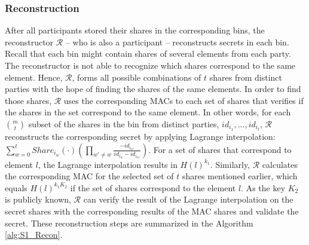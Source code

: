 \subsubsection{Reconstruction}\label{Recon_S1}
After all participants stored their shares in the corresponding bins, the reconstructor  $\mathcal{R}$ -- who is also a participant -- reconstructs secrets in each bin. Recall that each bin might contain shares of several elements from each party. The reconstructor is not able to recognize which shares correspond to the same element. Hence, $\mathcal{R}$, forms all possible combinations of $t$ shares from distinct parties with the hope of finding the shares of the same elements. In order to find those shares, $\mathcal{R}$ uses the corresponding MACs to each set of shares that verifies if the shares in the set correspond to the same element. In other words, for each $m \choose t$ subset of the shares in the bin from distinct parties, $id_{i_1}, \dots, id_{i_t}$, $\mathcal{R}$ reconstructs the corresponding secret by applying Lagrange interpolation: $\sum^t_{w=0} Share_{i_w}(\cdot)(\prod_{w' \neq w} \frac{-id_{i_{w'}}}{id_{i_w} - id_{i_{w'}}})$. For a set of shares that correspond to element $l$, the Lagrange interpolation results in $H(l)^{k_1}$. Similarly, $\mathcal{R}$ calculates the corresponding MAC for the selected set of $t$ shares mentioned earlier, which equals $H(l)^{k_1 K_2}$ if the set of shares correspond to the element $l$. As the key $K_2$ is publicly known, $\mathcal{R}$ can verify the result of the Lagrange interpolation on the secret shares with the corresponding results of the MAC shares and validate the secret. These reconstruction steps are summarized in the Algorithm \ref{alg:S1_Recon}. 

